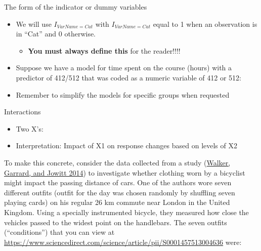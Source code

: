 \documentclass[
]{book}
\providecommand{\tightlist}{%
  \setlength{\itemsep}{0pt}\setlength{\parskip}{0pt}}
\begin{document}
The form of the indicator or dummy variables

\begin{itemize}
\item
  We will use \(I_{VarName=Cat}\) with \(I_{VarName=Cat}\) equal to 1 when an observation is in ``Cat'' and 0 otherwise.

  \begin{itemize}
  \tightlist
  \item
    \textbf{You must always define this} for the reader!!!!
  \end{itemize}
\item
  Suppose we have a model for time spent on the course (hours) with a predictor of 412/512 that was coded as a numeric variable of 412 or 512:
\item
  Remember to simplify the models for specific groups when requested
\end{itemize}

Interactions

\begin{itemize}
\item
  Two X's:
\item
  Interpretation: Impact of X1 on response changes based on levels of X2
\end{itemize}

\indent To make this concrete, consider the data collected from a study
(\protect\hyperlink{ref-Walker2014}{Walker, Garrard, and Jowitt 2014}) to investigate whether clothing worn by a bicyclist might impact the passing distance of cars. One of the authors wore seven different outfits (outfit for the day was chosen randomly by shuffling seven playing cards) on his regular 26 km commute near London in the United Kingdom. Using a specially instrumented bicycle, they measured how close the vehicles passed to the widest point on the handlebars. The seven outfits (``conditions'') that you can view at \url{https://www.sciencedirect.com/science/article/pii/S0001457513004636} were:
\end{document}
